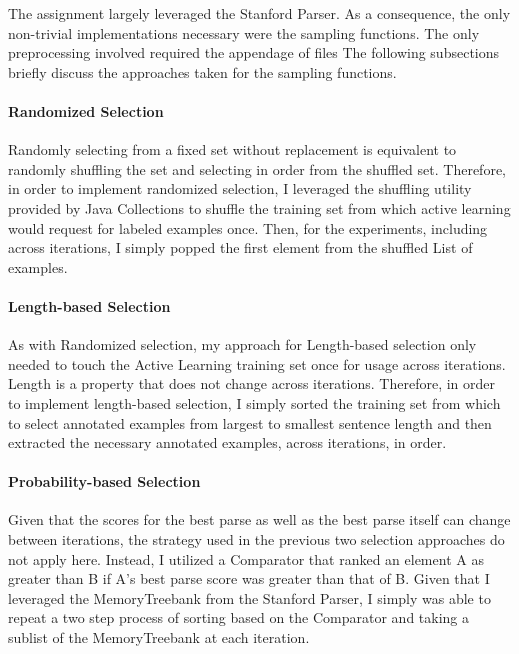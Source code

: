 \documentclass{article} %
\begin{document}
The assignment largely leveraged the Stanford Parser. As a consequence, the only non-trivial implementations necessary were the sampling functions. The only preprocessing involved required the appendage of files  The following subsections briefly discuss the approaches taken for the sampling functions. 

\paragraph{Randomized Selection}

Randomly selecting from a fixed set without replacement is equivalent to randomly shuffling the set and selecting in order from the shuffled set. Therefore, in order to implement randomized selection, I leveraged the shuffling utility provided by Java Collections to shuffle the training set from which active learning would request for labeled examples once. Then, for the experiments, including across iterations, I simply popped the first element from the shuffled List of examples.

\paragraph{Length-based Selection}

As with Randomized selection, my approach for Length-based selection only needed to touch the Active Learning training set once for usage across iterations. Length is a property that does not change across iterations. Therefore, in order to implement length-based selection, I simply sorted the training set from which to select annotated examples from largest to smallest sentence length and then extracted the necessary annotated examples, across iterations, in order.

\paragraph{Probability-based Selection}

Given that the scores for the best parse as well as the best parse itself can change between iterations, the strategy used in the previous two selection approaches do not apply here. Instead, I utilized a Comparator that ranked an element A as greater than B if A's best parse score was greater than that of B. Given that I leveraged the MemoryTreebank from the Stanford Parser, I simply was able to repeat a two step process of sorting based on the Comparator and taking a sublist of the MemoryTreebank at each iteration.
\end{document}
